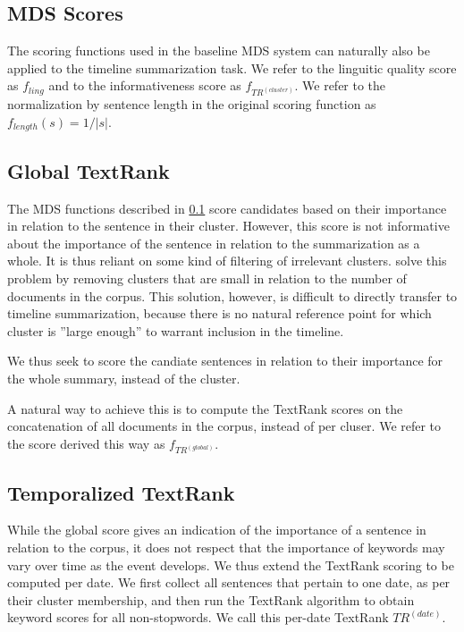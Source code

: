\documentclass[a4paper,BCOR=10mm]{report}
\begin{document}
\subsection{MDS Scores} \label{sec:mds-scores}

The scoring functions used in the baseline MDS system can naturally also be applied to the timeline summarization task.
We refer to the linguitic quality score as $f_{ling}$ and to the informativeness score as $f_{TR^{(cluster)}}$.
We refer to the normalization by sentence length in the original scoring function as $f_{length}(s) = 1 / |s|$.

\subsection{Global TextRank}

The MDS functions described in \ref{sec:mds-scores} score candidates based on their importance in relation to the sentence in their cluster.
However, this score is not informative about the importance of the sentence in relation to the summarization as a whole.
It is thus reliant on some kind of filtering of irrelevant clusters. \citet{banerjee} solve this problem by removing clusters that are small in relation to the number of documents in the corpus. This solution, however, is difficult to directly transfer to timeline summarization, because there is no natural reference point for which cluster is ''large enough'' to warrant inclusion in the timeline.

We thus seek to score the candiate sentences in relation to their importance for the whole summary, instead of the cluster.

A natural way to achieve this is to compute the TextRank scores on the concatenation of all documents in the corpus, instead of per cluser.
We refer to the score derived this way as $f_{TR^{(global)}}$.

\subsection{Temporalized TextRank}

While the global score gives an indication of the importance of a sentence in relation to the corpus, it does not respect that the importance of keywords may vary over time as the event develops.
We thus extend the TextRank scoring to be computed per date. We first collect all sentences that pertain to one date, as per their cluster membership, and then run the TextRank algorithm to obtain keyword scores for all non-stopwords. We call this per-date TextRank $TR^{(date)}$.
\end{document}
